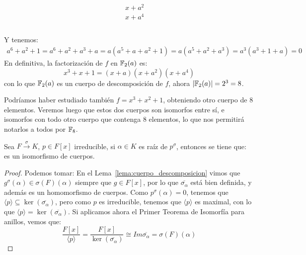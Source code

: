 \begin{ejemplo}
\begin{equation*}
\begin{array}{r|c}
\begin{array}{rcrcc}
            \end{array} & 
            \begin{array}{l}
                x+a^2 \\
                \hline
                x+a^4 \\ \\ \\ \\
            \end{array}
        \end{array}
    \end{equation*}
    Y tenemos:
    \begin{align*}
        a^6+a^2+1 = a^6+a^2 +a^3 +a = a(a^5+a+a^2+1) = a(a^5+a^2+a^3) = a^3(a^3 + 1 + a) = 0
    \end{align*}
    En definitiva, la factorización de $f$ en $\mathbb{F}_2(a)$ es:
    \begin{equation*}
        x^3+x+1 = (x+a)(x+a^2)(x+a^4)
    \end{equation*}
    con lo que $\mathbb{F}_2(a)$ es un cuerpo de descomposición de $f$, ahora $|\mathbb{F}_2(a)| = 2^3 = 8$.

    \noindent
    Podríamos haber estudiado también $f=x^3+x^2+1$, obteniendo otro cuerpo de $8$ elementos. Veremos luego que estos dos cuerpos son isomorfos entre sí, e isomorfos con todo otro cuerpo que contenga $8$ elementos, lo que nos permitirá notarlos a todos por $\mathbb{F}_8$.
\end{ejemplo}

\begin{lema}\label{lema:extension}
    Sea $F\stackrel{\sigma}{\to}{K}$, $p\in F[x]$ irreducible, si $\alpha\in K$ es raíz de $p^\sigma$, entonces se tiene que:
    es un isomorfismo de cuerpos.
    \begin{proof}
        Podemos tomar:
        En el Lema~\ref{lema:cuerpo_descomposicion} vimos que $g^{\sigma}(\alpha)\in \sigma(F)(\alpha)$ siempre que $g\in F[x]$, por lo que $\overline{\sigma_\alpha}$ está bien definida, y además es un homomorfismo de cuerpos. Como $p^\sigma(\alpha)=0$, tenemos que $\langle p \rangle \subseteq \ker(\overline{\sigma_\alpha})$, pero como $p$ es irreducible, tenemos que $\langle p \rangle $ es maximal, con lo que $\langle p \rangle =\ker(\overline{\sigma_\alpha})$. Si aplicamos ahora el Primer Teorema de Isomorfía para anillos, vemos que:
        \begin{equation*}
            \dfrac{F[x]}{\langle p \rangle } = \dfrac{F[x]}{\ker(\overline{\sigma_\alpha})} \cong Im \overline{\sigma_\alpha} = \sigma(F)(\alpha)
        \end{equation*}
    \end{proof}
\end{lema}

